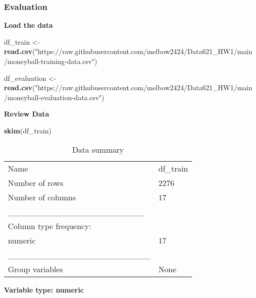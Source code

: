 \documentclass[
]{article}
\newenvironment{Shaded}{\begin{snugshade}}{\end{snugshade}}
\newcommand{\FunctionTok}[1]{\textcolor[rgb]{0.13,0.29,0.53}{\textbf{#1}}}
\newcommand{\NormalTok}[1]{#1}
\newcommand{\OtherTok}[1]{\textcolor[rgb]{0.56,0.35,0.01}{#1}}
\newcommand{\StringTok}[1]{\textcolor[rgb]{0.31,0.60,0.02}{#1}}
\begin{document}
\hypertarget{evaluation}{%
\subsubsection{Evaluation}\label{evaluation}}

\textbf{Load the data}

\begin{Shaded}
\begin{Highlighting}[]
\NormalTok{df\_train }\OtherTok{\textless{}{-}} \FunctionTok{read.csv}\NormalTok{(}\StringTok{"https://raw.githubusercontent.com/melbow2424/Data621\_HW1/main/moneyball{-}training{-}data.csv"}\NormalTok{)}

\NormalTok{df\_evaluation }\OtherTok{\textless{}{-}} \FunctionTok{read.csv}\NormalTok{(}\StringTok{"https://raw.githubusercontent.com/melbow2424/Data621\_HW1/main/moneyball{-}evaluation{-}data.csv"}\NormalTok{)}
\end{Highlighting}
\end{Shaded}

\textbf{Review Data}

\begin{Shaded}
\begin{Highlighting}[]
\FunctionTok{skim}\NormalTok{(df\_train)}
\end{Highlighting}
\end{Shaded}

\begin{longtable}[]{@{}ll@{}}
\caption{Data summary}\tabularnewline
\toprule\noalign{}
\endfirsthead
\endhead
\bottomrule\noalign{}
\endlastfoot
Name & df\_train \\
Number of rows & 2276 \\
Number of columns & 17 \\
\_\_\_\_\_\_\_\_\_\_\_\_\_\_\_\_\_\_\_\_\_\_\_ & \\
Column type frequency: & \\
numeric & 17 \\
\_\_\_\_\_\_\_\_\_\_\_\_\_\_\_\_\_\_\_\_\_\_\_\_ & \\
Group variables & None \\
\end{longtable}

\textbf{Variable type: numeric}
\end{document}
